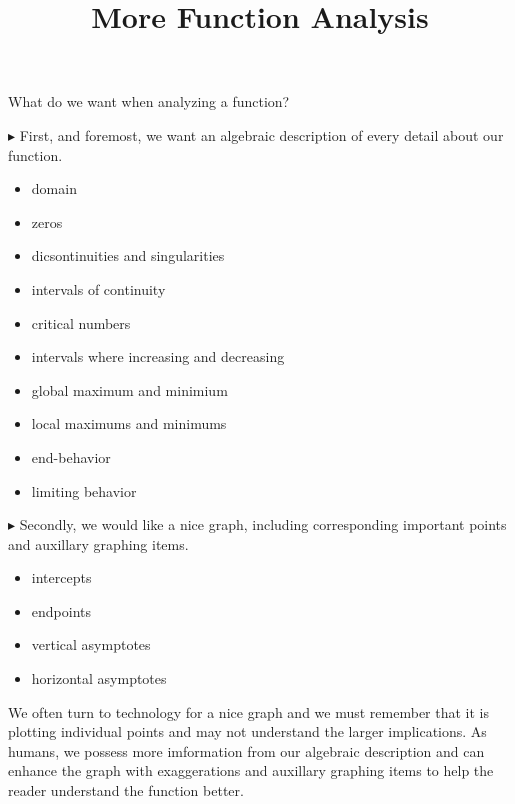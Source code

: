 \documentclass{ximera}
\title{More Function Analysis}
\begin{document}
\begin{abstract}
%
\end{abstract}
\maketitle






What do we want when analyzing a function?


$\blacktriangleright$ First, and foremost, we want an algebraic description of every detail about our function. 

\begin{itemize}
\item domain
\item zeros 
\item dicsontinuities and singularities
\item intervals of continuity
\item critical numbers
\item intervals where increasing and decreasing
\item global maximum and minimium
\item local maximums and minimums
\item end-behavior
\item limiting behavior
\end{itemize}



$\blacktriangleright$ Secondly, we would like a nice graph, including corresponding important points and auxillary graphing items.

\begin{itemize}
	\item intercepts
	\item endpoints
	\item vertical asymptotes
	\item horizontal asymptotes
\end{itemize}




We often turn to technology for a nice graph and we must remember that it is plotting individual points and may not understand the larger implications. As humans, we possess more imformation from our algebraic description and can enhance the graph with exaggerations and auxillary graphing items to help the reader understand the function better.
\end{document}
